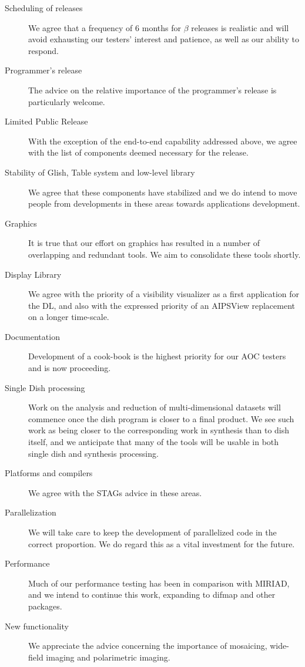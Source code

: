 \begin{description}
\item[Scheduling of releases] We agree that a frequency of 6 months
for $\beta$ releases is realistic and will avoid exhausting
our testers' interest and patience, as well as our ability to
respond.
\item[Programmer's release] The advice on the relative importance
of the programmer's release is particularly welcome.
\item[Limited Public Release] With the exception of the end-to-end
capability addressed above, we agree with the list of components
deemed necessary for the release.
\item[Stability of Glish, Table system and low-level library] We 
agree that these components have stabilized and we do intend
to move people from developments in these areas towards applications
development.
\item[Graphics] It is true that our effort on graphics
has resulted in a number of overlapping and redundant tools. We aim
to consolidate these tools shortly.
\item[Display Library] We agree with the priority of a visibility
visualizer as a first application for the DL, and also with
the expressed priority of an AIPSView replacement on a longer
time-scale.
\item[Documentation] Development of a cook-book
is the highest priority for our AOC testers and is now proceeding.
\item[Single Dish processing] Work on the analysis and
reduction of multi-dimensional datasets will commence once
the dish program is closer to a final product. We see such work
as being closer to the corresponding work in synthesis than
to dish itself, and we anticipate that many of the tools
will be usable in both single dish and synthesis processing.
\item[Platforms and compilers] We agree with the STAGs advice in
these areas.
\item[Parallelization] We will take care to keep the development
of parallelized code in the correct proportion. We do regard
this as a vital investment for the future.
\item[Performance] Much of our performance testing has been
in comparison with MIRIAD, and we intend to continue this
work, expanding to difmap and other packages.
\item[New functionality] We appreciate the advice concerning
the importance of mosaicing, wide-field imaging and
polarimetric imaging.
\end{description}

